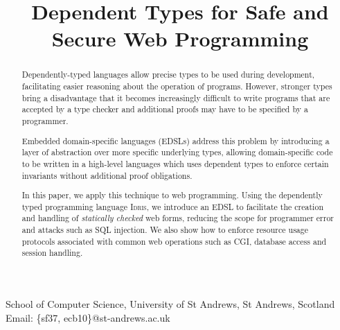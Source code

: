 \documentclass[preprint]{sigplanconf}
\begin{document}
\newcommand{\idris}{\textsc{Idris}}
\newcommand{\idata}{\textsf{iData}}
\newcommand{\itasks}{\textsf{iTasks}}
\newcommand{\Idris}{\textsc{Idris}}
\setlength{\pdfpageheight}{\paperheight}
\setlength{\pdfpagewidth}{\paperwidth}





\titlebanner{}        %
\preprintfooter{}   %

\title{Dependent Types for Safe and Secure Web Programming}
           {School of Computer Science, University of St Andrews, St Andrews, Scotland}
           {Email: \{sf37, ecb10\}@st-andrews.ac.uk}

\maketitle

\begin{abstract}
Dependently-typed languages allow precise types to be used during development,
facilitating easier reasoning about the operation of programs. However,
stronger types bring a disadvantage that it becomes increasingly difficult to
write programs that are accepted by a type checker and additional proofs may
have to be specified by a programmer.

Embedded domain-specific languages (EDSLs) address this problem by introducing
a layer of abstraction over more specific underlying types, allowing
domain-specific code to be written in a high-level languages which uses
dependent types to enforce certain invariants without additional proof
obligations. 

In this paper, we apply this technique to web programming.  Using the
dependently typed programming language \Idris{}, we introduce an EDSL to
facilitate the creation and handling of \emph{statically checked} web forms,
reducing the scope for programmer error and attacks such as SQL injection. We
also show how to enforce resource usage protocols associated with common web
operations such as CGI, database access and session handling.  

\end{abstract}
\end{document}
